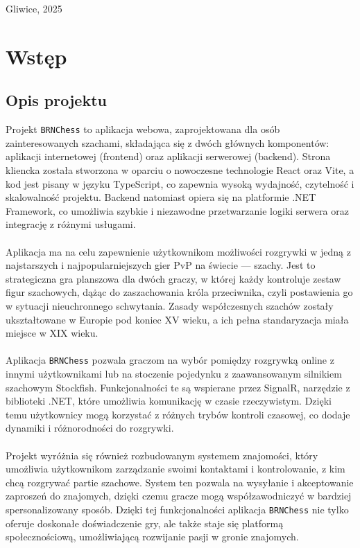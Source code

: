\documentclass[12pt,a4paper]{article}
\begin{document}
\vfill

\begin{center} Gliwice, 2025 \end{center}

\newpage

\tableofcontents

\newpage

\section{Wstęp}

\subsection{Opis projektu}

Projekt \texttt{BRNChess} to aplikacja webowa, zaprojektowana dla osób zainteresowanych szachami, składająca się z dwóch głównych komponentów: aplikacji internetowej (frontend) oraz aplikacji serwerowej (backend). Strona kliencka została stworzona w oparciu o nowoczesne technologie React oraz Vite, a kod jest pisany w języku TypeScript, co zapewnia wysoką wydajność, czytelność i skalowalność projektu. Backend natomiast opiera się na platformie .NET Framework, co umożliwia szybkie i niezawodne przetwarzanie logiki serwera oraz integrację z różnymi usługami.
\\\\
Aplikacja ma na celu zapewnienie użytkownikom możliwości rozgrywki w jedną z najstarszych i najpopularniejszych gier PvP na świecie — szachy. Jest to strategiczna gra planszowa dla dwóch graczy, w której każdy kontroluje zestaw figur szachowych, dążąc do zaszachowania króla przeciwnika, czyli postawienia go w sytuacji nieuchronnego schwytania. Zasady współczesnych szachów zostały ukształtowane w Europie pod koniec XV wieku, a ich pełna standaryzacja miała miejsce w XIX wieku.
\\\\
Aplikacja \texttt{BRNChess} pozwala graczom na wybór pomiędzy rozgrywką online z innymi użytkownikami lub na stoczenie pojedynku z zaawansowanym silnikiem szachowym Stockfish. Funkcjonalności te są wspierane przez SignalR, narzędzie z biblioteki .NET, które umożliwia komunikację w czasie rzeczywistym. Dzięki temu użytkownicy mogą korzystać z różnych trybów kontroli czasowej, co dodaje dynamiki i różnorodności do rozgrywki.
\\\\
Projekt wyróżnia się również rozbudowanym systemem znajomości, który umożliwia użytkownikom zarządzanie swoimi kontaktami i kontrolowanie, z kim chcą rozgrywać partie szachowe. System ten pozwala na wysyłanie i akceptowanie zaproszeń do znajomych, dzięki czemu gracze mogą współzawodniczyć w bardziej spersonalizowany sposób. Dzięki tej funkcjonalności aplikacja \texttt{BRNChess} nie tylko oferuje doskonałe doświadczenie gry, ale także staje się platformą społecznościową, umożliwiającą rozwijanie pasji w gronie znajomych.
\end{document}
